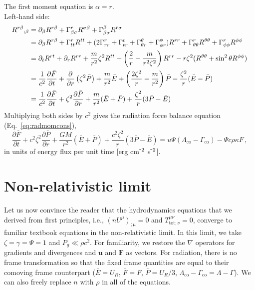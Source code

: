 \documentclass[../main.tex]{subfiles}
\begin{document}
\noindent The first moment equation is $\alpha=r$.\\
Left-hand side:
\begin{align*}
    R^{r\beta}{}_{;\beta}&=\partial_\beta R^{r\beta}+\Gamma^{r}_{\beta\sigma}R^{\sigma\beta}+\Gamma^{\beta}_{\beta\sigma}R^{r\sigma}\\
    &=\partial_\beta R^{r\beta}+\Gamma^{r}_{tt}R^{tt}+(2\Gamma^{r}_{rr}+\Gamma^{t}_{tr}+\Gamma^{\theta}_{
    \theta r}+\Gamma^{\phi}_{\phi r})R^{rr}+\Gamma^{r}_{\theta\theta}R^{\theta\theta}+\Gamma^{r}_{\phi\phi}R^{\phi\phi}\\
    &=\partial_t R^{rt}+\partial_r R^{rr}+\frac{m}{r^2}\zeta^2 R^{tt}+\left(\frac{2}{r}-\frac{m}{r^2\zeta^2}\right)R^{rr}-r\zeta^2(R^{\theta\theta}+\sin^2\theta R^{\phi\phi})\\
    &=\frac{1}{c^2}\frac{\partial\bar{F}}{\partial t}+\frac{\partial}{\partial r}\left(\zeta^2\bar{P}\right)+\frac{m}{r^2}\bar{E}+\left(\frac{2\zeta^2}{r}-\frac{m}{r^2}\right)\bar{P}-\frac{\zeta^2}{r}(\bar{E}-\bar{P})\\
    &=\frac{1}{c^2}\frac{\partial\bar{F}}{\partial t}+\zeta^2\frac{\partial\bar{P}}{\partial r}+\frac{m}{r^2}(\bar{E}+\bar{P})+\frac{\zeta^2}{r}(3\bar{P}-\bar{E})
\end{align*}
Multiplying both sides by $c^2$ gives the radiation force balance equation (Eq.~\ref{eq:radmomcons}),
\begin{equation}
    \frac{\partial \bar{F}}{\partial t}+c^2\zeta^2\frac{\partial\bar{P}}{\partial r}+\frac{GM}{r^2}(\bar{E}+\bar{P})+\frac{c^2\zeta^2}{r}(3\bar{P}-\bar{E})=u\Psi(\Lambda_\text{co}-\Gamma_\text{co})-\Psi c\rho\kappa F\,,
\end{equation}
in units of energy flux per unit time [erg cm$^{\-2}$ s$^{\-2}$].


\section*{Non-relativistic limit}
Let us now convince the reader that the hydrodynamics equations that we derived from first principles, i.e., $(nU^\mu)_{;\mu}=0$ and $T^{\mu\nu}_{\text{tot};\nu}=0$, converge to familiar textbook equations in the non-relativistic limit. In this limit, we take $\zeta=\gamma=\Psi=1$ and $P_g\ll \rho c^2$.  For familiarity, we restore the $\nabla$ operators for gradients and divergences and $\bm{u}$ and $\bm{F}$ as vectors.  For radiation, there is no frame transformation so that the fixed frame quantities are equal to their comoving frame counterpart ($\bar{E}=U_R$, $\bar{F}=F$, $\bar{P}=U_R /3$, $\Lambda_\text{co}-\Gamma_\text{co}=\Lambda-\Gamma$).  We can also freely replace $n$ with $\rho$ in all of the equations.\\
\end{document}
